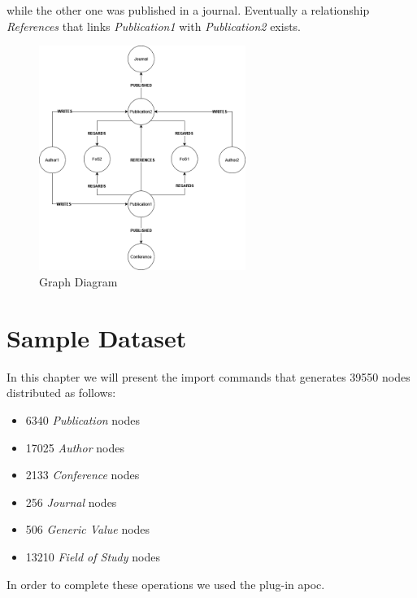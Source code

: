 \documentclass{Configuration_Files/PoliMi3i_thesis}
\begin{document}
while the other one was published in a journal. Eventually a relationship \emph{References} that
links \emph{Publication1} with \emph{Publication2} exists.
\begin{figure}[H]
    \centering
    \includegraphics[width=0.6\textwidth]{graphDiagram.png}
    \caption{Graph Diagram}
    \label{fig:graphDiagram}
\end{figure}

\chapter{Sample Dataset}
In this chapter we will present the import commands that generates 39550 nodes distributed as follows:
\begin{itemize}
    \item 6340 \emph{Publication} nodes
    \item 17025 \emph{Author} nodes
    \item 2133 \emph{Conference} nodes
    \item 256 \emph{Journal} nodes
    \item 506 \emph{Generic Value} nodes
    \item 13210 \emph{Field of Study} nodes
\end{itemize}
In order to complete these operations we used the plug-in apoc.
\end{document}
